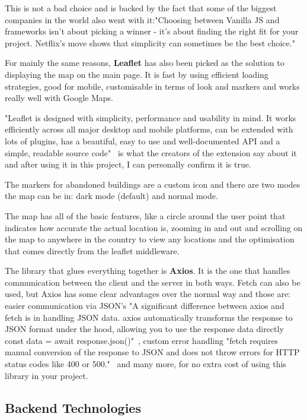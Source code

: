 \documentclass[12pt,a4paper]{report}
\begin{document}
This is not a bad choice and is backed by the fact that some of the biggest companies in the world also went with it:"Choosing between Vanilla JS and frameworks isn't about picking a winner - it's about finding the right fit for your project. Netflix's move shows that simplicity can sometimes be the best choice."~\cite{vanillaVsFrameworks}

For mainly the same reasons, \textbf{Leaflet} has also been picked as the solution to displaying the map on the main page. It is fast by using efficient loading strategies, good for mobile, customisable in terms of look and markers and works really well with Google Maps.

"Leaflet is designed with simplicity, performance and usability in mind. It works efficiently across all major desktop and mobile platforms, can be extended with lots of plugins, has a beautiful, easy to use and well-documented API and a simple, readable source code"~\cite{leafletJs} is what the creators of the extension say about it and after using it in this project, I can personally confirm it is true.

The markers for abandoned buildings are a custom icon and there are two modes the map can be in: dark mode (default) and normal mode.

The map has all of the basic features, like a circle around the user point that indicates how accurate the actual location is, zooming in and out and scrolling on the map to anywhere in the country to view any locations and the optimisation that comes directly from the leaflet middleware.

The library that glues everything together is \textbf{Axios}. It is the one that handles communication between the client and the server in both ways. Fetch can also be used, but Axios has some clear advantages over the normal way and those are: easier communication via JSON's "A significant difference between axios and fetch is in handling JSON data. axios automatically transforms the response to JSON format under the hood, allowing you to use the response data directly const data = await response.json()"~\cite{axiosVsFetch}, custom error handling "fetch requires manual conversion of the response to JSON and does not throw errors for HTTP status codes like 400 or 500."~\cite{axiosVsFetch} and many more, for no extra cost of using this library in your project.

\subsection{Backend Technologies}
\end{document}
